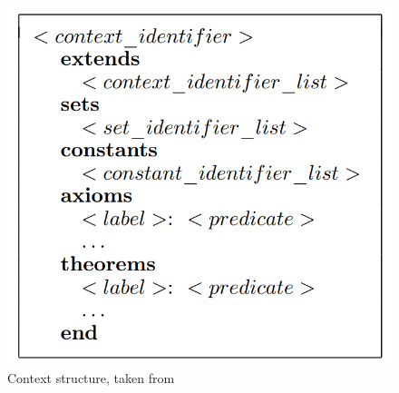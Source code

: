 \begin{figure}
    \centering
    \includegraphics[scale = 0.3]{images/eventb2.PNG}
    \caption{Context structure, taken from \cite{Abrial2011}}
    \label{fig:eventb2}
\end{figure}

